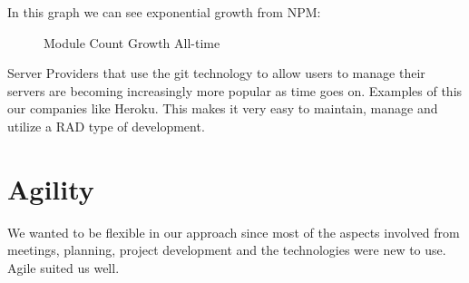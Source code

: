 In this graph we can see exponential growth from NPM:
\begin{figure}[H] 
	\caption{Module Count Growth All-time }
	\label{fig:speciation}
\end{figure}

Server Providers that use the git \cite{git} technology to allow users to manage their servers are becoming increasingly more popular as time goes on.
Examples of this our companies like Heroku.
This makes it very easy to maintain, manage and utilize a RAD type of development.

\section{Agility}
We wanted to be flexible in our approach since most of the aspects involved from meetings, planning, project development and the technologies were new to use. Agile suited us well.

